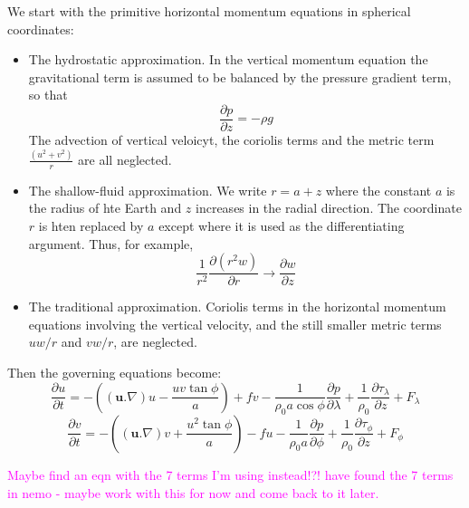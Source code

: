 \documentclass[..\EOYR.tex]{subfiles}
\begin{document}
We start with the primitive horizontal momentum equations in spherical coordinates:
\begin{itemize}
    \item The hydrostatic approximation. In the vertical momentum equation the gravitational term is assumed to be balanced by the pressure gradient term, so that
        \begin{equation}
            \frac{\partial p}{\partial z} = -\rho g
        \end{equation}
        The advection of vertical veloicyt, the coriolis terms and the metric term $\frac{(u^2 + v^2)}{r}$ are all neglected.
    \item The shallow-fluid approximation. We write $r=a+z$ where the constant $a$ is the radius of hte Earth and $z$ increases in the radial direction. The coordinate $r$ is hten replaced by $a$ except where it is used as the differentiating argument. Thus, for example,
        \begin{equation}
            \frac{1}{r^2}\frac{\partial (r^2 w)}{\partial r} \to \frac{\partial w}{\partial z}
        \end{equation}
    \item The traditional approximation. Coriolis terms in the horizontal momentum equations involving the vertical velocity, and the still smaller metric terms $uw/r$ and $vw/r$, are neglected.
\end{itemize}

Then the governing equations become:
\begin{equation} \label{PrimMomUMB}
    \frac{\partial u}{\partial t}=-((\mathbf{u}.\nabla)u - \frac{uv\tan \phi }{a}) + fv - \frac{1}{\rho_0 a \cos \phi}\frac{\partial p}{\partial \lambda} + \frac{1}{\rho_0}\frac{\partial \tau_\lambda}{\partial z} + F_\lambda
\end{equation}
\begin{equation} \label{PrimMomVMB}
    \frac{\partial v}{\partial t}=-((\mathbf{u}.\nabla)v + \frac{u^2\tan \phi }{a}) - fu - \frac{1}{\rho_0 a}\frac{\partial p}{\partial \phi} + \frac{1}{\rho_0}\frac{\partial \tau_\phi}{\partial z} + F_\phi
\end{equation}

\textcolor{magenta}{Maybe find an eqn with the 7 terms I'm using instead!?! have found the 7 terms in nemo - maybe work with this for now and come back to it later.}
\end{document}
